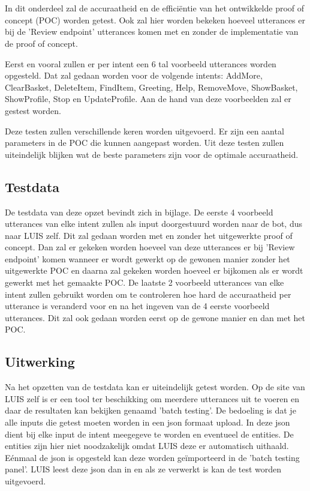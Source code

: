 \chapter{}
\label{ch:res}

In dit onderdeel zal de accuraatheid en de efficiëntie van het ontwikkelde proof of concept (POC) worden getest. Ook zal hier worden bekeken hoeveel utterances er bij de 'Review endpoint' utterances komen met en zonder de implementatie van de proof of concept.

Eerst en vooral zullen er per intent een 6 tal voorbeeld utterances worden opgesteld. Dat zal gedaan worden voor de volgende intents: AddMore, ClearBasket, DeleteItem, FindItem, Greeting, Help, RemoveMove, ShowBasket, ShowProfile, Stop en UpdateProfile. Aan de hand van deze voorbeelden zal er gestest worden.

Deze testen zullen verschillende keren worden uitgevoerd. Er zijn een aantal parameters in de POC die kunnen aangepast worden. Uit deze testen zullen uiteindelijk blijken wat de beste parameters zijn voor de optimale accuraatheid.

\section{Testdata}
\label{sec:testdata}

De testdata van deze opzet bevindt zich in bijlage. De eerste 4 voorbeeld utterances van elke intent zullen als input doorgestuurd worden naar de bot, dus naar LUIS zelf. Dit zal gedaan worden met en zonder het uitgewerkte proof of concept. Dan zal er gekeken worden hoeveel van deze utterances er bij 'Review endpoint' komen wanneer er wordt gewerkt op de gewonen manier zonder het uitgewerkte POC en daarna zal gekeken worden hoeveel er bijkomen als er wordt gewerkt met het gemaakte POC. De laatste 2 voorbeeld utterances van elke intent zullen gebruikt worden om te controleren hoe hard de accuraatheid per utterance is veranderd voor en na het ingeven van de 4 eerste voorbeeld utterances. Dit zal ook gedaan worden eerst op de gewone manier en dan met het POC.

\section{Uitwerking}
\label{sec:uitwerking}

Na het opzetten van de testdata kan er uiteindelijk getest worden. Op de site van LUIS zelf is er een tool ter beschikking om meerdere utterances uit te voeren en daar de resultaten kan bekijken genaamd 'batch testing'. De bedoeling is dat je alle inputs die getest moeten worden in een json formaat upload. In deze json dient bij elke input de intent meegegeve te worden en eventueel de entities. De entities zijn hier niet noodzakelijk omdat LUIS deze er automatisch uithaald. Eénmaal de json is opgesteld kan deze worden geïmporteerd in de 'batch testing panel'. LUIS leest deze json dan in en als ze verwerkt is kan de test worden uitgevoerd.

